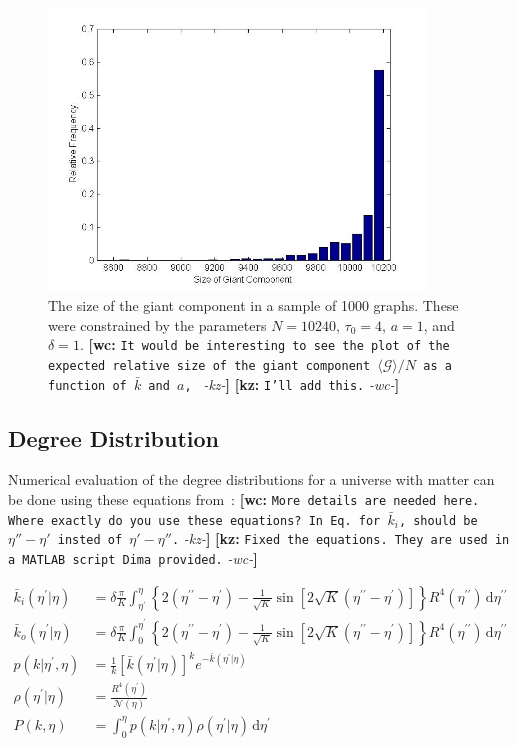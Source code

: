 \documentclass[preprint,notitlepage,amsmath,amssymb,floatfix]{revtex4-1}
\newcommand{\XXX}[3]{{\bf [#1: } {\tt #3} {\it -#2-}{\bf ]}}
\begin{document}
\begin{figure}
\includegraphics[width=10cm]{figures/Giant_Component.jpg}
\caption{The size of the giant component in a sample of 1000 graphs.  These were constrained by the parameters $N = 10240$, $\tau_0 = 4$, $a = 1$, and $\delta = 1$. \XXX{wc}{kz}{It would be interesting to see the plot of the expected relative size of the giant component $\langle\mathcal{G}\rangle/N$ as a function of $\bar{k}$ and $a$, } \XXX{kz}{wc}{I'll add this.}}
\label{fig:size_gcc_uni}
\centering
\end{figure}

\subsection{Degree Distribution}
Numerical evaluation of the degree distributions for a universe with matter can be done using these equations from~\cite{ref:snc2012}: \XXX{wc}{kz}{More details are needed here. Where exactly do you use these equations? In Eq. for $\bar{k}_i$, should be $\eta''-\eta'$ insted of $\eta'-\eta''$.} \XXX{kz}{wc}{Fixed the equations. They are used in a MATLAB script Dima provided.}

\begin{align}
\bar{k}_i\left(\eta^\prime|\eta\right) &= \delta\frac{\pi}{K}\int_{\eta^\prime}^\eta\!\left\{2\left(\eta^{\prime\prime} - \eta^{\prime}\right) - \frac{1}{\sqrt{K}}\sin\left[2\sqrt{K}\left(\eta^{\prime\prime} - \eta^{\prime}\right)\right]\right\}R^4\left(\eta^{\prime\prime}\right)\, \mathrm d\eta^{\prime\prime} \\
\bar{k}_o\left(\eta^\prime|\eta\right) &= \delta\frac{\pi}{K}\int_0^{\eta^\prime}\!\left\{2\left(\eta^{\prime\prime} - \eta^{\prime}\right) - \frac{1}{\sqrt{K}}\sin\left[2\sqrt{K}\left(\eta^{\prime\prime} - \eta^{\prime}\right)\right]\right\}R^4\left(\eta^{\prime\prime}\right)\, \mathrm d\eta^{\prime\prime} \\
p\left(k|\eta^\prime,\eta\right) &= \frac{1}{k\!}\left[\bar{k} \left(\eta^\prime|\eta\right)\right]^k e^{-\bar{k} \left(\eta^\prime|\eta\right)} \\
\rho\left(\eta^\prime|\eta\right) &= \frac{R^4\left(\eta^\prime\right)}{\mathcal N \left(\eta\right)} \\
P\left(k,\eta\right) &= \int_0^\eta\! p\left(k|\eta^\prime,\eta\right)\rho\left(\eta^\prime|\eta\right)\,\mathrm d\eta^\prime
\end{align}
\end{document}
